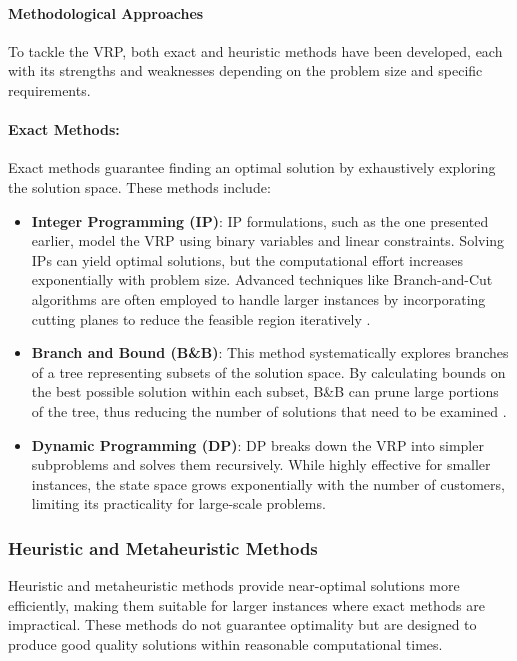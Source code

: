 \documentclass[
]{article}
\begin{document}
\paragraph{Methodological Approaches}
To tackle the VRP, both exact and heuristic methods have been developed, each with its strengths and weaknesses depending on the problem size and specific requirements.

\paragraph{Exact Methods:}
Exact methods guarantee finding an optimal solution by exhaustively exploring the solution space. These methods include:

\begin{itemize}
    \item \textbf{Integer Programming (IP)}: IP formulations, such as the one presented earlier, model the VRP using binary variables and linear constraints. Solving IPs can yield optimal solutions, but the computational effort increases exponentially with problem size. Advanced techniques like Branch-and-Cut algorithms are often employed to handle larger instances by incorporating cutting planes to reduce the feasible region iteratively \cite{Toth2002}.
    \item \textbf{Branch and Bound (B\&B)}: This method systematically explores branches of a tree representing subsets of the solution space. By calculating bounds on the best possible solution within each subset, B\&B can prune large portions of the tree, thus reducing the number of solutions that need to be examined \cite{Laporte1992}.
    \item \textbf{Dynamic Programming (DP)}: DP breaks down the VRP into simpler subproblems and solves them recursively. While highly effective for smaller instances, the state space grows exponentially with the number of customers, limiting its practicality for large-scale problems.
\end{itemize}

\hypertarget{heuristic-and-metaheuristic-methods}{%
\subsubsection{Heuristic and Metaheuristic Methods}\label{heuristic-and-metaheuristic-methods}}

Heuristic and metaheuristic methods provide near-optimal solutions more efficiently, making them suitable for larger instances where exact methods are impractical. These methods do not guarantee optimality but are designed to produce good quality solutions within reasonable computational times.
\end{document}
